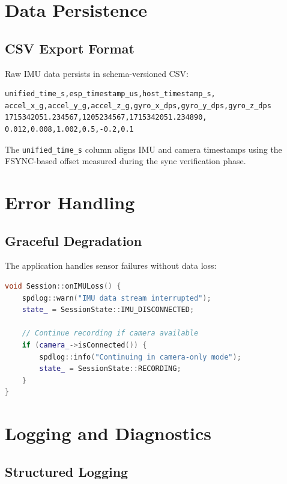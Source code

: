 \section{Data Persistence}

\subsection{CSV Export Format}

Raw IMU data persists in schema-versioned CSV:

\begin{verbatim}
unified_time_s,esp_timestamp_us,host_timestamp_s,
accel_x_g,accel_y_g,accel_z_g,gyro_x_dps,gyro_y_dps,gyro_z_dps
1715342051.234567,1205234567,1715342051.234890,
0.012,0.008,1.002,0.5,-0.2,0.1
\end{verbatim}

The \texttt{unified\_time\_s} column aligns IMU and camera timestamps using the FSYNC-based offset measured during the sync verification phase.

\section{Error Handling}

\subsection{Graceful Degradation}

The application handles sensor failures without data loss:

\begin{lstlisting}[language=c++]
void Session::onIMULoss() {
    spdlog::warn("IMU data stream interrupted");
    state_ = SessionState::IMU_DISCONNECTED;

    // Continue recording if camera available
    if (camera_->isConnected()) {
        spdlog::info("Continuing in camera-only mode");
        state_ = SessionState::RECORDING;
    }
}
\end{lstlisting}

\section{Logging and Diagnostics}

\subsection{Structured Logging}

